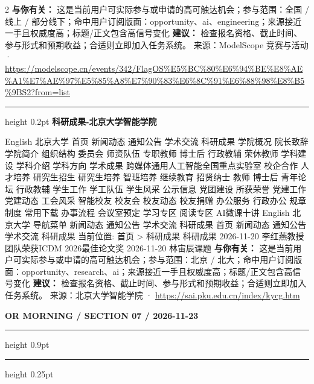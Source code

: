 \documentclass[10.5pt]{ctexart}
\begin{document}
\begin{multicols}{2}
\textbf{与你有关：} 这是当前用户可实际参与或申请的高可触达机会；参与范围：全国 / 线上 / 部分线下；命中用户订阅版面：opportunity、ai、engineering；来源接近一手且权威度高；标题/正文包含高信号变化
\textbf{建议：} 检查报名资格、截止时间、参与形式和预期收益；合适则立即加入任务系统。
{\footnotesize\color{ormuted} 来源：ModelScope 竞赛与活动 · \url{https://modelscope.cn/events/342/FlagOS%E5%BC%80%E6%94%BE%E8%AE%A1%E7%AE%97%E5%85%A8%E7%90%83%E6%8C%91%E6%88%98%E8%B5%9BS2?from=list}}
\vspace{2mm}
\hrule height 0.2pt
\vspace{2mm}
{\large\bfseries 科研成果-北京大学智能学院}\par
English 北京大学 首页 新闻动态 通知公告 学术交流 科研成果 学院概况 院长致辞 学院简介 组织结构 委员会 师资队伍 专职教师 博士后 行政教辅 荣休教师 学科建设 学科介绍 学科方向 学术成果 跨媒体通用人工智能全国重点实验室 校企合作 人才培养 研究生招生 研究生培养 智班培养 继续教育 招贤纳士 教师 博士后 青年论坛 行政教辅 学生工作 学工队伍 学生风采 公示信息 党团建设 所获荣誉 党建工作 党建动态 工会风采 智能校友 校友会 校友动态 校友捐赠 办公服务 行政办公 规章制度 常用下载 办事流程 会议室预定 学习专区 阅读专区 AI微课十讲 English 北京大学 导航菜单 新闻动态 通知公告 学术交流 科研成果 首页 新闻动态 通知公告 学术交流 科研成果 当前位置: 首页 > 科研成果 科研成果 2026-11-20 李红燕教授团队荣获ICDM 2026最佳论文奖 2026-11-20 林宙辰课题
\textbf{与你有关：} 这是当前用户可实际参与或申请的高可触达机会；参与范围：北京 / 北大；命中用户订阅版面：opportunity、research、ai；来源接近一手且权威度高；标题/正文包含高信号变化
\textbf{建议：} 检查报名资格、截止时间、参与形式和预期收益；合适则立即加入任务系统。
{\footnotesize\color{ormuted} 来源：北京大学智能学院 · \url{https://sai.pku.edu.cn/index/kycg.htm}}
\end{multicols}
\newpage
{\small\bfseries OR MORNING / SECTION 07 / 2026-11-23}
\vspace{2mm}
\hrule height 0.9pt
\vspace{1.5mm}
\hrule height 0.25pt
\vspace{4mm}
\end{document}

